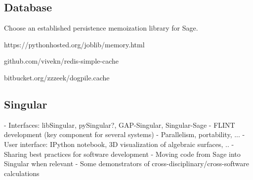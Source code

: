 \subsection{Database}

Choose an established persistence memoization library for Sage.

https://pythonhosted.org/joblib/memory.html

github.com/vivekn/redis-simple-cache

bitbucket.org/zzzeek/dogpile.cache

\subsection{Singular}

- Interfaces: libSingular, pySingular?, GAP-Singular, Singular-Sage
- FLINT development (key component for several systems)
- Parallelism, portability, ...
- User interface: IPython notebook, 3D visualization of algebraic surfaces, ..
- Sharing best practices for software development
- Moving code from Sage into Singular when relevant
- Some demonstrators of cross-disciplinary/cross-software calculations
